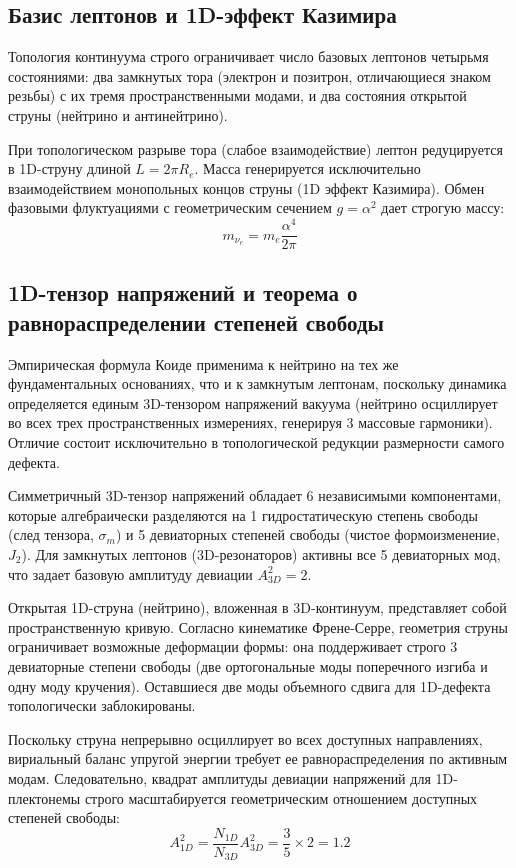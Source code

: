 \documentclass[12pt,a4paper]{article}
\begin{document}
	\subsection{Базис лептонов и 1D-эффект Казимира}
	Топология континуума строго ограничивает число базовых лептонов четырьмя состояниями: два замкнутых тора (электрон и позитрон, отличающиеся знаком резьбы) с их тремя пространственными модами, и два состояния открытой струны (нейтрино и антинейтрино). 
	
	При топологическом разрыве тора (слабое взаимодействие) лептон редуцируется в 1D-струну длиной $L = 2\pi R_e$. Масса генерируется исключительно взаимодействием монопольных концов струны (1D эффект Казимира). Обмен фазовыми флуктуациями с геометрическим сечением $g = \alpha^2$ дает строгую массу:
	\begin{equation}
		m_{\nu_e} = m_e \frac{\alpha^4}{2\pi}
	\end{equation}
	
	\subsection{1D-тензор напряжений и теорема о равнораспределении степеней свободы}
	Эмпирическая формула Коиде применима к нейтрино на тех же фундаментальных основаниях, что и к замкнутым лептонам, поскольку динамика определяется единым 3D-тензором напряжений вакуума (нейтрино осциллирует во всех трех пространственных измерениях, генерируя 3 массовые гармоники). Отличие состоит исключительно в топологической редукции размерности самого дефекта. 
	
	Симметричный 3D-тензор напряжений обладает 6 независимыми компонентами, которые алгебраически разделяются на 1 гидростатическую степень свободы (след тензора, $\sigma_m$) и 5 девиаторных степеней свободы (чистое формоизменение, $J_2$). 
	Для замкнутых лептонов (3D-резонаторов) активны все 5 девиаторных мод, что задает базовую амплитуду девиации $A_{3D}^2 = 2$.
	
	Открытая 1D-струна (нейтрино), вложенная в 3D-континуум, представляет собой пространственную кривую. Согласно кинематике Френе-Серре, геометрия струны ограничивает возможные деформации формы: она поддерживает строго 3 девиаторные степени свободы (две ортогональные моды поперечного изгиба и одну моду кручения). Оставшиеся две моды объемного сдвига для 1D-дефекта топологически заблокированы.
	
	Поскольку струна непрерывно осциллирует во всех доступных направлениях, вириальный баланс упругой энергии требует ее равнораспределения по активным модам. Следовательно, квадрат амплитуды девиации напряжений для 1D-плектонемы строго масштабируется геометрическим отношением доступных степеней свободы:
	\begin{equation}
		A_{1D}^2 = \frac{N_{1D}}{N_{3D}} A_{3D}^2 = \frac{3}{5} \times 2 = \mathbf{1.2}
	\end{equation}
	
\end{document}
